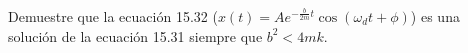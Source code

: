 \item Demuestre que la ecuación 15.32 ($x(t) = A e^{-\frac{b}{2m}t} \cos(\omega_d t + \phi)$) es una solución de la ecuación 15.31 siempre que $b^2 < 4mk$.